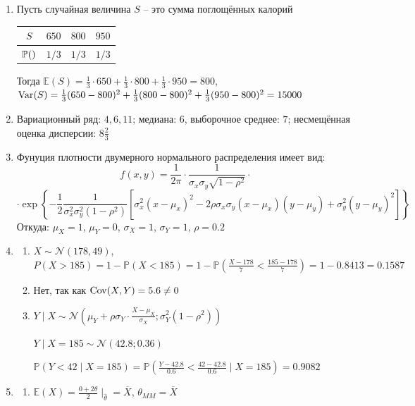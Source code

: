 \documentclass[12pt, a4paper]{article}\usepackage[]{graphicx}\usepackage[]{color}
\begin{document}
\begin{enumerate}
	\item Пусть случайная величина $S$ – это сумма поглощённых калорий
		
	\begin{tabular}{c|ccc}
		$S$ & $650$ & $800$ & $950$ \\
		\hline
		$\P()$ & $1/3$ & $1/3$ & $1/3$ \\
	\end{tabular}
		
	Тогда $\mathbb{E}(S) = \frac{1}{3}\cdot 650 +  \frac{1}{3}\cdot 800 +  \frac{1}{3}\cdot 950 = 800$, $\Var(S) = \frac{1}{3}(650-800)^2 + \frac{1}{3}(800-800)^2 + \frac{1}{3}(950-800)^2 = 15000$
	\item Вариационный ряд: $4, 6, 11$; медиана: $6$, выборочное среднее: $7$; несмещённая оценка дисперсии: $8 \frac{2}{3}$
	\item Фунуция плотности двумерного нормального распределения имеет вид:
	\[
		f(x,y) =  \frac{1}{2\pi}\cdot \frac{1}{\sigma_x \sigma_y \sqrt{1-\rho^2}} \cdot
	\]
		\[\cdot \exp\left\{{-\frac{1}{2}\frac{1}{\sigma_x^2 \sigma_y^2(1-\rho^2)}\left[\sigma_x^2(x-\mu_x)^2-2\rho\sigma_x\sigma_y(x-\mu_x)(y-\mu_y)+\sigma_y^2(y-\mu_y)^2\right]}\right\}
	\]
	Откуда: $\mu_X=1$, $\mu_Y=0$, $\sigma_X = 1$, $\sigma_Y = 1$, $\rho = 0.2$
	
	\item
	\begin{enumerate}
		\item $X \sim \mathcal{N}(178, 49)$, $P(X>185) = 1  - \mathbb{P}(X<185) = 1- \mathbb{P}\left(\frac{X-178}{7} < \frac{185-178}{7}\right) = 1 - 0.8413 = 0.1587$
		\item Нет, так как $\Cov(X, Y) = 5.6 \neq 0$
		\item $Y \mid X \sim \mathcal{N}\left(\mu_Y + \rho\sigma_Y\cdot\frac{X-\mu_X}{\sigma_X}; \sigma_Y^2(1-\rho^2)\right)$
		
		$Y \mid X=185 \sim \mathcal{N}(42.8;0.36)$
		
		$\mathbb{P}(Y<42 \mid X=185) = \mathbb{P}\left(\frac{Y-42.8}{0.6} < \frac{42-42.8}{0.6}\mid X=185\right) = 0.9082$
	\end{enumerate}
	
	\item
	\begin{enumerate}
		\item $\mathbb{E}(X) = \frac{0+2\theta}{2}\mid_{\hat{\theta}} = \overline{X}$, $\theta_{MM} = \overline{X}$
	\end{enumerate}
		

\end{enumerate}
\end{document}
